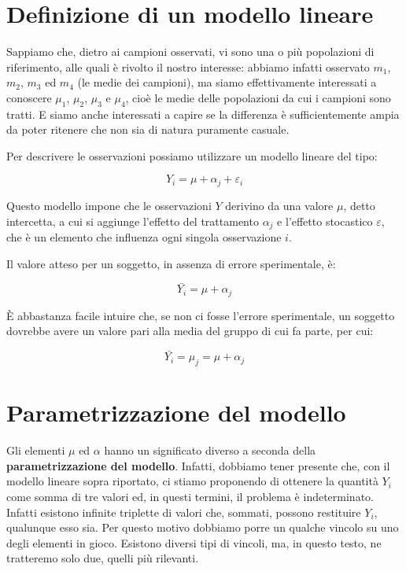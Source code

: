 \documentclass[a4paper,12pt,oneside]{book}
\begin{document}
\hypertarget{definizione-di-un-modello-lineare}{%
\section{Definizione di un modello lineare}\label{definizione-di-un-modello-lineare}}

Sappiamo che, dietro ai campioni osservati, vi sono una o più popolazioni di riferimento, alle quali è rivolto il nostro interesse: abbiamo infatti osservato \(m_1\), \(m_2\), \(m_3\) ed \(m_4\) (le medie dei campioni), ma siamo effettivamente interessati a conoscere \(\mu_1\), \(\mu_2\), \(\mu_3\) e \(\mu_4\), cioè le medie delle popolazioni da cui i campioni sono tratti. E siamo anche interessati a capire se la differenza è sufficientemente ampia da poter ritenere che non sia di natura puramente casuale.

Per descrivere le osservazioni possiamo utilizzare un modello lineare del tipo:

\[Y_i = \mu + \alpha_j + \varepsilon_i\]

Questo modello impone che le osservazioni \(Y\) derivino da una valore \(\mu\), detto intercetta, a cui si aggiunge l'effetto del trattamento \(\alpha_j\) e l'effetto stocastico \(\varepsilon\), che è un elemento che influenza ogni singola osservazione \(i\).

Il valore atteso per un soggetto, in assenza di errore sperimentale, è:

\[\bar{Y_i} = \mu + \alpha_j\]

È abbastanza facile intuire che, se non ci fosse l'errore sperimentale, un soggetto dovrebbe avere un valore pari alla media del gruppo di cui fa parte, per cui:

\[\bar{Y_i} = \mu_j = \mu + \alpha_j\]

\hypertarget{parametrizzazione-del-modello}{%
\section{Parametrizzazione del modello}\label{parametrizzazione-del-modello}}

Gli elementi \(\mu\) ed \(\alpha\) hanno un significato diverso a seconda della \textbf{parametrizzazione del modello}. Infatti, dobbiamo tener presente che, con il modello lineare sopra riportato, ci stiamo proponendo di ottenere la quantità \(Y_i\) come somma di tre valori ed, in questi termini, il problema è indeterminato. Infatti esistono infinite triplette di valori che, sommati, possono restituire \(Y_i\), qualunque esso sia. Per questo motivo dobbiamo porre un qualche vincolo su uno degli elementi in gioco. Esistono diversi tipi di vincoli, ma, in questo testo, ne tratteremo solo due, quelli più rilevanti.
\end{document}
